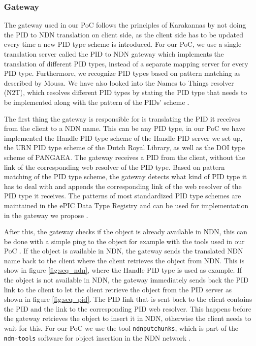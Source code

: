 
\subsubsection{Gateway}\label{gw}
The gateway used in our PoC follows the principles of Karakannas by not doing the PID to NDN translation on client side, as the client side has to be updated every time a new PID type scheme is introduced. For our PoC, we use a single translation server called the PID to NDN gateway which implements the translation of different PID types, instead of a separate mapping server for every PID type. Furthermore, we recognize PID types based on pattern matching as described by Mousa. We have also looked into the Names to Things resolver (N2T), which resolves different PID types by stating the PID type that needs to be implemented along with the pattern of the PIDs' scheme \cite{n2t}.

The first thing the gateway is responsible for is translating the PID it receives from the client to a NDN name. This can be any PID type, in our PoC we have implemented the Handle PID type scheme of the Handle PID server we set up, the URN PID type scheme of the Dutch Royal Library, as well as the DOI type scheme of PANGAEA. The gateway receives a PID from the client, without the link of the corresponding web resolver of the PID type. Based on pattern matching of the PID type scheme, the gateway detects what kind of PID type it has to deal with and appends the corresponding link of the web resolver of the PID type it receives. 
The patterns of most standardized PID type schemes are maintained in the ePIC Data Type Registry and can be used for implementation in the gateway we propose \cite{dtr}. 

After this, the gateway checks if the object is already available in NDN, this can be done with a simple ping to the object for example with the tools used in our PoC \cite{ndn-tools}. 
If the object is available in NDN, the gateway sends the translated NDN name back to the client where the client retrieves the object from NDN. This is show in figure \ref{fig:seq_ndn}, where the Handle PID type is used as example. If the object is not available in NDN, the gateway immediately sends back the PID link to the client to 
let the client retrieve the object from the PID server as shown in figure \ref{fig:seq_pid}. The PID link that is sent back to the client contains the PID and the link to the corresponding PID web resolver. This happens before the gateway retrieves the object to insert it in NDN, otherwise the client needs to wait for this. For our PoC we use the tool \texttt{ndnputchunks}, which is part of the \texttt{ndn-tools} software for object insertion in the NDN network \cite{ndn-tools}.

